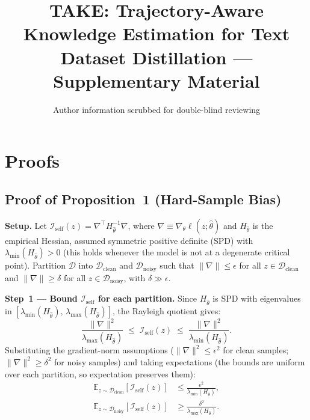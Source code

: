\documentclass[runningheads]{llncs}
\begin{document}
\title{TAKE: Trajectory-Aware Knowledge Estimation for Text Dataset Distillation --- Supplementary Material}
\author{Author information scrubbed for double-blind reviewing}
\maketitle

\appendix

\section{Proofs}
\label{app:proofs}

\subsection{Proof of Proposition~1 (Hard-Sample Bias)}
\label{app:proof-hsb}

\textbf{Setup.}
Let $\mathcal{I}_\text{self}(z) = \nabla^\top H_{\hat\theta}^{-1} \nabla$, where $\nabla \equiv \nabla_\theta \ell(z;\hat\theta)$ and $H_{\hat\theta}$ is the empirical Hessian, assumed symmetric positive definite (SPD) with $\lambda_{\min}(H_{\hat\theta}) > 0$ (this holds whenever the model is not at a degenerate critical point).
Partition $\mathcal{D}$ into $\mathcal{D}_\text{clean}$ and $\mathcal{D}_\text{noisy}$ such that $\|\nabla\| \leq \epsilon$ for all $z \in \mathcal{D}_\text{clean}$ and $\|\nabla\| \geq \delta$ for all $z \in \mathcal{D}_\text{noisy}$, with $\delta \gg \epsilon$.

\textbf{Step~1 --- Bound $\mathcal{I}_\text{self}$ for each partition.}
Since $H_{\hat\theta}$ is SPD with eigenvalues in $[\lambda_{\min}(H_{\hat\theta}),\, \lambda_{\max}(H_{\hat\theta})]$, the Rayleigh quotient gives:
\begin{equation}
    \frac{\|\nabla\|^2}{\lambda_{\max}(H_{\hat\theta})}
    \;\leq\; \mathcal{I}_\text{self}(z)
    \;\leq\; \frac{\|\nabla\|^2}{\lambda_{\min}(H_{\hat\theta})}.
\end{equation}
Substituting the gradient-norm assumptions ($\|\nabla\|^2 \leq \epsilon^2$ for clean samples; $\|\nabla\|^2 \geq \delta^2$ for noisy samples) and taking expectations (the bounds are uniform over each partition, so expectation preserves them):
\begin{align}
    \mathbb{E}_{z \sim \mathcal{D}_\text{clean}}[\mathcal{I}_\text{self}(z)]
        &\leq \frac{\epsilon^2}{\lambda_{\min}(H_{\hat\theta})}, \\
    \mathbb{E}_{z \sim \mathcal{D}_\text{noisy}}[\mathcal{I}_\text{self}(z)]
        &\geq \frac{\delta^2}{\lambda_{\max}(H_{\hat\theta})}.
\end{align}
\end{document}
